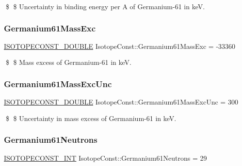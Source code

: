 \$ \$ Uncertainty in binding energy per A of Germanium-\/61 in keV. \mbox{\label{group___isotope_const-_germanium-_ge61_gaaf6858643c30b46b4090097b738622ed}} 
\subsubsection{\texorpdfstring{Germanium61\+Mass\+Exc}{Germanium61MassExc}}
{\footnotesize\ttfamily \mbox{\hyperlink{group___isotope_const-_macros_ga8f45a7272ce02c0b4c65c44636ed719a}{I\+S\+O\+T\+O\+P\+E\+C\+O\+N\+S\+T\+\_\+\+D\+O\+U\+B\+LE}} Isotope\+Const\+::\+Germanium61\+Mass\+Exc = -\/33360}

\$ \$ Mass excess of Germanium-\/61 in keV. \mbox{\label{group___isotope_const-_germanium-_ge61_ga51761f540a9a8d76b581c82e6f8459f1}} 
\subsubsection{\texorpdfstring{Germanium61\+Mass\+Exc\+Unc}{Germanium61MassExcUnc}}
{\footnotesize\ttfamily \mbox{\hyperlink{group___isotope_const-_macros_ga8f45a7272ce02c0b4c65c44636ed719a}{I\+S\+O\+T\+O\+P\+E\+C\+O\+N\+S\+T\+\_\+\+D\+O\+U\+B\+LE}} Isotope\+Const\+::\+Germanium61\+Mass\+Exc\+Unc = 300}

\$ \$ Uncertainty in mass excess of Germanium-\/61 in keV. \mbox{\label{group___isotope_const-_germanium-_ge61_ga09dc845d915419225989a228aa9f2e14}} 
\subsubsection{\texorpdfstring{Germanium61\+Neutrons}{Germanium61Neutrons}}
{\footnotesize\ttfamily \mbox{\hyperlink{group___isotope_const-_macros_ga5f18360b3e99483a35c32d789e62621c}{I\+S\+O\+T\+O\+P\+E\+C\+O\+N\+S\+T\+\_\+\+I\+NT}} Isotope\+Const\+::\+Germanium61\+Neutrons = 29}

